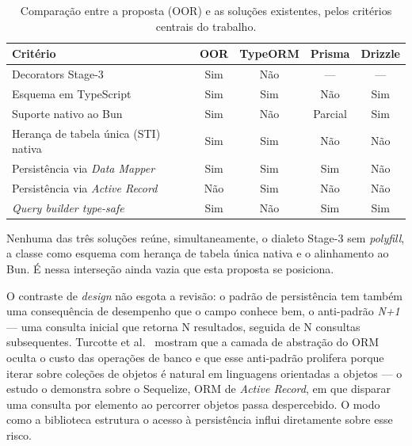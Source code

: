 \begin{table}[ht]
\centering
\caption{Comparação entre a proposta (OOR) e as soluções existentes, pelos critérios centrais do trabalho.}
\label{tab:orms}
\begin{tabular}{p{6.4cm}cccc}
\toprule
\myrowcolour
\textbf{Critério} & \textbf{OOR} & TypeORM & Prisma & Drizzle \\
\midrule
Decorators Stage-3 & Sim & Não & --- & --- \\
Esquema em TypeScript & Sim & Sim & Não & Sim \\
Suporte nativo ao Bun & Sim & Não & Parcial & Sim \\
Herança de tabela única (STI) nativa & Sim & Sim & Não & Não \\
Persistência via \emph{Data Mapper} & Sim & Sim & Sim & Não \\
Persistência via \emph{Active Record} & Não & Sim & Não & Não \\
\emph{Query builder type-safe} & Sim & Não & Sim & Sim \\
\bottomrule
\end{tabular}
\end{table}

Nenhuma das três soluções reúne, simultaneamente, o dialeto Stage-3 sem \emph{polyfill}, a classe como esquema com herança de tabela única nativa e o alinhamento ao Bun. É nessa interseção ainda vazia que esta proposta se posiciona.

O contraste de \emph{design} não esgota a revisão: o padrão de persistência tem também uma consequência de desempenho que o campo conhece bem, o anti-padrão \emph{N+1} --- uma consulta inicial que retorna N resultados, seguida de N consultas subsequentes. Turcotte et al.~\cite{reformulator} mostram que a camada de abstração do ORM oculta o custo das operações de banco e que esse anti-padrão prolifera porque iterar sobre coleções de objetos é natural em linguagens orientadas a objetos --- o estudo o demonstra sobre o Sequelize, ORM de \emph{Active Record}, em que disparar uma consulta por elemento ao percorrer objetos passa despercebido. O modo como a biblioteca estrutura o acesso à persistência influi diretamente sobre esse risco.

